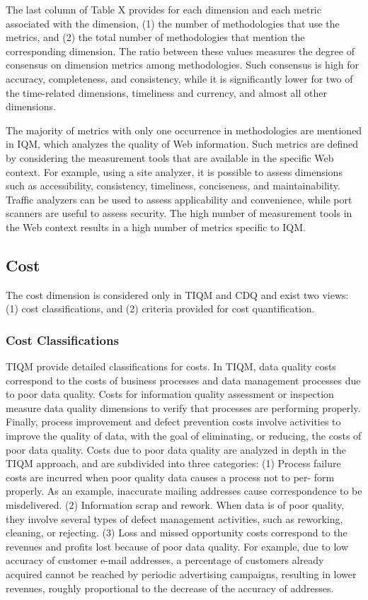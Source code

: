 \documentclass[pdftex,english,oribibl]{llncs}
\begin{document}
The last column of Table X provides for each dimension and each metric associated with the dimension, (1) the number of methodologies that use the metrics, and (2) the total number of methodologies that mention the corresponding dimension.
The ratio between these values measures the degree of consensus on dimension metrics among methodologies.
Such consensus is high for accuracy, completeness, and consistency, while it is significantly lower for two of the time-related dimensions, timeliness and currency, and almost all other dimensions.

The majority of metrics with only one occurrence in methodologies are mentioned in IQM, which analyzes the quality of Web information.
Such metrics are defined by considering the measurement tools that are available in the specific Web context.
For example, using a site analyzer, it is possible to assess dimensions such as accessibility, consistency, timeliness, conciseness, and maintainability.
Traffic analyzers can be used to assess applicability and convenience, while port scanners are useful to assess security.
The high number of measurement tools in the Web context results in a high number of metrics specific to IQM.

\subsection{Cost}
The cost dimension is considered only in TIQM and CDQ and exist two views: (1) cost classifications, and (2) criteria provided for cost quantification.

\subsubsection{Cost Classifications}
TIQM provide detailed classifications for costs.
In TIQM, data quality costs correspond to the costs of business processes and data management processes due to poor data quality. Costs for information quality assessment or inspection measure data quality dimensions to verify that processes are performing properly. Finally, process improvement and defect prevention costs involve activities to improve the quality of data, with the goal of eliminating, or reducing, the costs of poor data quality. Costs due to poor data quality are analyzed in depth in the TIQM approach, and are subdivided into three categories:
(1) Process failure costs are incurred when poor quality data causes a process not to per- form properly. As an example, inaccurate mailing addresses cause correspondence to be misdelivered.
(2) Information scrap and rework. When data is of poor quality, they involve several types of defect management activities, such as reworking, cleaning, or rejecting.
(3) Loss and missed opportunity costs correspond to the revenues and profits lost because of poor data quality. For example, due to low accuracy of customer e-mail addresses, a percentage of customers already acquired cannot be reached by periodic advertising campaigns, resulting in lower revenues, roughly proportional to the decrease of the accuracy of addresses.
\end{document}
